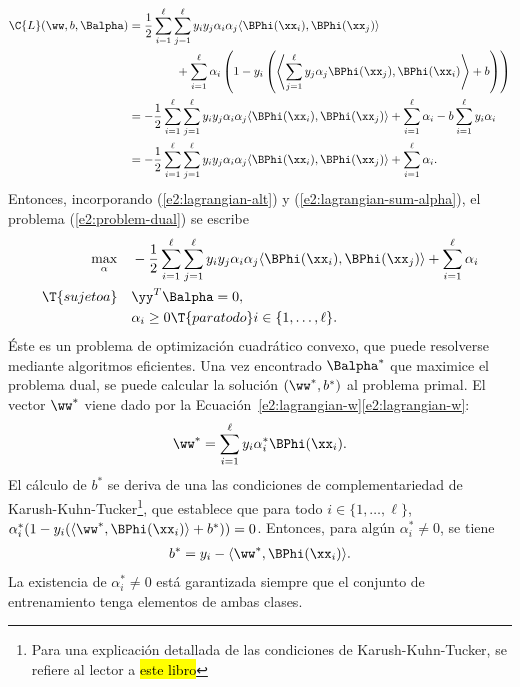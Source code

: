 %
\begin{align}
  \C{L}(\ww,b,\Balpha)
  & = 
    \frac{1}{2}\sum_{i=1}^\ell\sum_{j=1}^\ell y_iy_j\alpha_i\alpha_j
    \langle\BPhi(\xx_i),\BPhi(\xx_j)\rangle \\
    &\qquad\qquad +
    \sum_{i=1}^{\ell} \alpha_i \left(1-y_i\left(\left\langle
    \sum_{j=1}^\ell y_j\alpha_j\BPhi(\xx_j) ,\BPhi(\xx_i)\right\rangle
    +b\right)\right)\\
  & = 
    -\frac{1}{2}\sum_{i=1}^\ell\sum_{j=1}^\ell y_iy_j\alpha_i\alpha_j
    \langle\BPhi(\xx_i),\BPhi(\xx_j)\rangle +
    \sum_{i=1}^{\ell} \alpha_i  - b \sum_{i=1}^\ell y_i\alpha_i \\
    \label{e2:lagrangian-alt}
    & = 
    -\frac{1}{2}\sum_{i=1}^\ell\sum_{j=1}^\ell y_iy_j\alpha_i\alpha_j
    \langle\BPhi(\xx_i),\BPhi(\xx_j)\rangle +
    \sum_{i=1}^{\ell} \alpha_i  .
\end{align}
%
Entonces, incorporando (\ref{e2:lagrangian-alt}) y
(\ref{e2:lagrangian-sum-alpha}), el problema (\ref{e2:problem-dual})
se escribe
%
\begin{align}
  \begin{split}
    \max_\alpha &\quad
    -\frac{1}{2}\sum_{i=1}^\ell\sum_{j=1}^\ell y_iy_j\alpha_i\alpha_j
    \langle \BPhi(\xx_i),\BPhi(\xx_j) \rangle +
    \sum_{i=1}^{\ell} \alpha_i \\
    \T{sujeto a} &\quad \yy^T\Balpha = 0, \\
    &\quad \alpha_i \geq 0\T{ para todo } i\in\{1,\ldots,\ell\}.
  \end{split}
  \label{prob2}
\end{align}
%
Éste es un problema de optimización cuadrático convexo, que puede
resolverse mediante algoritmos eficientes.  Una vez encontrado
$\Balpha^*$ que maximice el problema dual, se puede calcular la
solución $(\ww^*,b^*)$ al problema primal.  El vector $\ww^*$ viene
dado por la
\iflatexml{}Ecuación~\ref{e2:lagrangian-w}\else\autoref{e2:lagrangian-w}\fi:
%
\begin{align}\label{e2:w-from-alpha}
  \ww^* = \sum_{i=1}^\ell y_i\alpha^*_i\BPhi(\xx_i).
\end{align}
%
El cálculo de $b^*$ se deriva de una las condiciones de
complementariedad de Karush-Kuhn-Tucker\footnote{Para una explicación
  detallada de las condiciones de Karush-Kuhn-Tucker, se refiere al
  lector a \hl{este libro}}, que establece que para todo
$i\in\{1,\ldots,\ell\}$,
$\alpha^*_i(1-y_i(\langle\ww^*,\BPhi(\xx_i)\rangle+b^*))=0$. Entonces,
para algún $\alpha^*_i\neq0$, se tiene
%
\begin{align}
  b^* = y_i - \langle\ww^*,\BPhi(\xx_i)\rangle .
\end{align}
%
La existencia de $\alpha^*_i\neq0$ está garantizada siempre que el
conjunto de entrenamiento tenga elementos de ambas clases.
%
%
